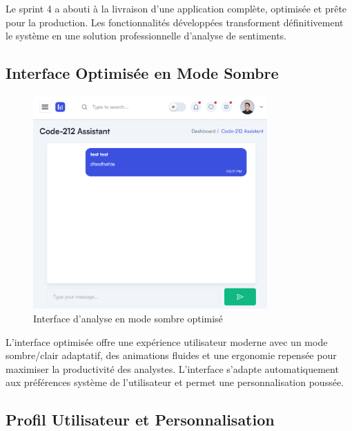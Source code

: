 Le sprint 4 a abouti à la livraison d'une application complète, optimisée et prête pour la production. Les fonctionnalités développées transforment définitivement le système en une solution professionnelle d'analyse de sentiments.

\subsection{Interface Optimisée en Mode Sombre}

\begin{figure}[H]
\centering
\includegraphics[width=0.8\textwidth]{assets/images/light-chat.png}
\caption{Interface d'analyse en mode sombre optimisé}
\label{fig:dark-mode-interface}
\end{figure}

L'interface optimisée offre une expérience utilisateur moderne avec un mode sombre/clair adaptatif, des animations fluides et une ergonomie repensée pour maximiser la productivité des analystes. L'interface s'adapte automatiquement aux préférences système de l'utilisateur et permet une personnalisation poussée.

\subsection{Profil Utilisateur et Personnalisation}

